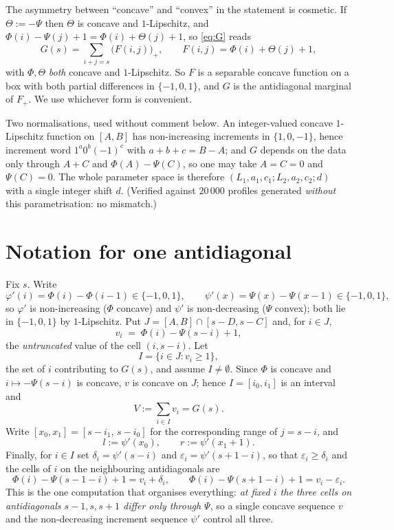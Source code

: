 \documentclass[11pt]{article}
\theoremstyle{definition}
\begin{document}
The asymmetry between ``concave'' and ``convex'' in the statement is cosmetic. If
$\Theta:=-\Psi$ then $\Theta$ is concave and $1$-Lipschitz, and
$\Phi(i)-\Psi(j)+1=\Phi(i)+\Theta(j)+1$, so \eqref{eq:G} reads
\begin{equation}\label{eq:sym}
  G(s)=\sum_{i+j=s}\bigl(F(i,j)\bigr)_+,\qquad F(i,j)=\Phi(i)+\Theta(j)+1,
\end{equation}
with $\Phi,\Theta$ \emph{both} concave and $1$-Lipschitz. So $F$ is a separable concave
function on a box with both partial differences in $\{-1,0,1\}$, and $G$ is the
antidiagonal marginal of $F_+$. We use whichever form is convenient.

\medskip
Two normalisations, used without comment below. An integer-valued concave $1$-Lipschitz
function on $[A,B]$ has non-increasing increments in $\{1,0,-1\}$, hence increment word
$1^a0^b(-1)^c$ with $a+b+c=B-A$; and $G$ depends on the data only through $A+C$ and
$\Phi(A)-\Psi(C)$, so one may take $A=C=0$ and $\Psi(C)=0$. The whole parameter space is
therefore $(L_1,a_1,c_1;L_2,a_2,c_2;d)$ with a single integer shift $d$. (Verified
against $20\,000$ profiles generated \emph{without} this parametrisation: no mismatch.)

\section{Notation for one antidiagonal}\label{sec:notation}

Fix $s$. Write
\[
  \varphi'(i)=\Phi(i)-\Phi(i-1)\in\{-1,0,1\},\qquad
  \psi'(x)=\Psi(x)-\Psi(x-1)\in\{-1,0,1\},
\]
so $\varphi'$ is non-increasing ($\Phi$ concave) and $\psi'$ is non-decreasing ($\Psi$
convex); both lie in $\{-1,0,1\}$ by $1$-Lipschitz. Put
$J=[A,B]\cap[s-D,s-C]$ and, for $i\in J$,
\[
  v_i \;=\; \Phi(i)-\Psi(s-i)+1 ,
\]
the \emph{untruncated} value of the cell $(i,s-i)$. Let
\[
  I=\{i\in J: v_i\ge 1\},
\]
the set of $i$ contributing to $G(s)$, and assume $I\ne\emptyset$. Since $\Phi$ is
concave and $i\mapsto-\Psi(s-i)$ is concave, $v$ is concave on $J$; hence
$I=[i_0,i_1]$ is an interval and
\[
  V:=\sum_{i\in I}v_i=G(s).
\]
Write $[x_0,x_1]=[s-i_1,\,s-i_0]$ for the corresponding range of $j=s-i$, and
\[
  l:=\psi'(x_0),\qquad r:=\psi'(x_1+1).
\]
Finally, for $i\in I$ set $\delta_i=\psi'(s-i)$ and $\varepsilon_i=\psi'(s+1-i)$, so that
$\varepsilon_i\ge\delta_i$ and the cells of $i$ on the neighbouring antidiagonals are
\begin{equation}\label{eq:threecells}
  \Phi(i)-\Psi(s-1-i)+1=v_i+\delta_i,\qquad
  \Phi(i)-\Psi(s+1-i)+1=v_i-\varepsilon_i .
\end{equation}
This is the one computation that organises everything: \emph{at fixed $i$ the three cells
on antidiagonals $s-1,s,s+1$ differ only through $\Psi$}, so a single concave sequence
$v$ and the non-decreasing increment sequence $\psi'$ control all three.
\end{document}
